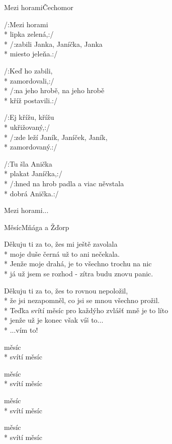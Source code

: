 \documentclass[10.5pt]{book}
\begin{document}
\begin{poem}{Mezi horami}{Čechomor}

\settowidth{\versewidth}{hned na hrob padla a viac něvstala}

/:Mezi horami\\*
lipka zelená,:/\\*
/:zabili Janka, Janíčka, Janka\\*
miesto jeleňa.:/

/:Keď ho zabili,\\*
zamordovali,:/\\*
/:na jeho hrobě, na jeho hrobě\\*
kříž postavili.:/

/:Ej křížu, křížu\\*
ukřižovaný,:/\\*
/:zde leží Janík, Janíček, Janík,\\*
zamordovaný.:/

/:Tu šla Anička\\*
plakat Janíčka,:/\\*
/:hned na hrob padla a viac něvstala\\*
dobrá Anička.:/

Mezi horami... 
\end{poem}

\begin{poem}{Měsíc}{Mňága a Žďorp}

\settowidth{\versewidth}{teďka svítí měsíc pro každýho zvlášť mně je to líto}

Děkuju ti za to, žes mi ještě zavolala\\*
moje duše černá už to ani nečekala.\\*
Jenže moje drahá, je to všechno trochu na nic\\*
já už jsem se rozhod - zítra budu znovu panic. 

Děkuju ti za to, žes to rovnou nepoložil,\\*
že jsi nezapomněl, co jsi se mnou všechno prožil.\\*
Teďka svítí měsíc pro každýho zvlášť mně je to líto\\*
jenže už je konec však víš to...\\*
...vím to!

měsíc\\*
svítí měsíc

měsíc\\*
svítí měsíc

měsíc\\*
svítí měsíc

měsíc\\*
svítí měsíc

\end{poem}
\end{document}
